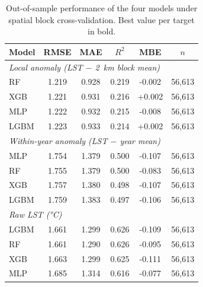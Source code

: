 \begin{table}[t]
\centering
\caption{Out-of-sample performance of the four models under spatial block cross-validation. Best value per target in bold.}
\label{tab:models}
\begin{tabular}{lccccc}
\toprule
Model & RMSE & MAE & $R^2$ & MBE & $n$ \\
\midrule
\multicolumn{6}{l}{\textit{Local anomaly (LST $-$ 2~km block mean)}} \\
\midrule
RF & 1.219 & 0.928 & 0.219 & -0.002 & 56,613 \\
XGB & 1.221 & 0.931 & 0.216 & +0.002 & 56,613 \\
MLP & 1.222 & 0.932 & 0.215 & -0.008 & 56,613 \\
LGBM & 1.223 & 0.933 & 0.214 & +0.002 & 56,613 \\
\midrule
\multicolumn{6}{l}{\textit{Within-year anomaly (LST $-$ year mean)}} \\
\midrule
MLP & 1.754 & 1.379 & 0.500 & -0.107 & 56,613 \\
RF & 1.755 & 1.379 & 0.500 & -0.083 & 56,613 \\
XGB & 1.757 & 1.380 & 0.498 & -0.107 & 56,613 \\
LGBM & 1.759 & 1.383 & 0.497 & -0.106 & 56,613 \\
\midrule
\multicolumn{6}{l}{\textit{Raw LST (°C)}} \\
\midrule
LGBM & 1.661 & 1.299 & 0.626 & -0.109 & 56,613 \\
RF & 1.661 & 1.290 & 0.626 & -0.095 & 56,613 \\
XGB & 1.663 & 1.299 & 0.625 & -0.111 & 56,613 \\
MLP & 1.685 & 1.314 & 0.616 & -0.077 & 56,613 \\
\bottomrule
\end{tabular}
\end{table}
